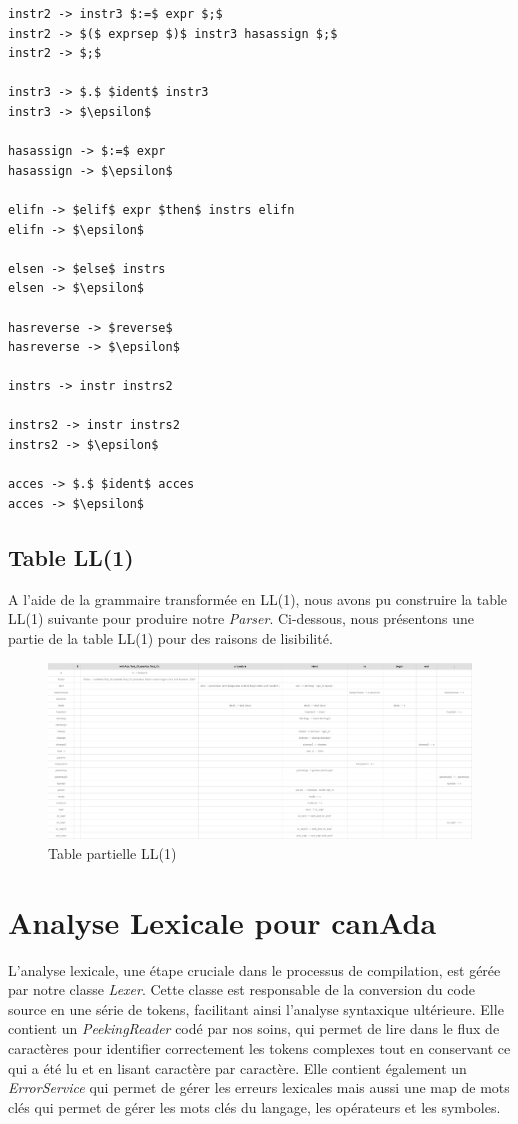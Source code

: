 \documentclass[french,a4paper]{article}
\begin{document}
\begin{lstlisting}[label={lst:lstlisting9}]
instr2 -> instr3 $:=$ expr $;$
instr2 -> $($ exprsep $)$ instr3 hasassign $;$
instr2 -> $;$

instr3 -> $.$ $ident$ instr3
instr3 -> $\epsilon$

hasassign -> $:=$ expr
hasassign -> $\epsilon$

elifn -> $elif$ expr $then$ instrs elifn
elifn -> $\epsilon$

elsen -> $else$ instrs
elsen -> $\epsilon$

hasreverse -> $reverse$
hasreverse -> $\epsilon$

instrs -> instr instrs2

instrs2 -> instr instrs2
instrs2 -> $\epsilon$

acces -> $.$ $ident$ acces
acces -> $\epsilon$
    \end{lstlisting}

    \subsection{Table LL(1)}\label{subsec:table-ll(1)}

    A l'aide de la grammaire transformée en LL(1), nous avons pu construire la table LL(1) suivante pour produire notre \textit{Parser}.
    Ci-dessous, nous présentons une partie de la table LL(1) pour des raisons de lisibilité.

    \begin{figure}[H]
        \centering
        \includegraphics[width=1\textwidth]{partial_table}
        \caption{Table partielle LL(1)}\label{fig:figure2}
    \end{figure}

    \section{Analyse Lexicale pour canAda}\label{sec:analyse-lexicale-pour-canada}

    L'analyse lexicale, une étape cruciale dans le processus de compilation, est gérée par notre classe \textit{Lexer}.
    Cette classe est responsable de la conversion du code source en une série de tokens, facilitant ainsi l'analyse syntaxique ultérieure.
    Elle contient un \textit{PeekingReader} codé par nos soins, qui permet de lire dans le flux de caractères pour identifier correctement les tokens complexes tout en conservant ce qui a été lu et en lisant caractère par caractère.
    Elle contient également un \textit{ErrorService} qui permet de gérer les erreurs lexicales mais aussi une map de mots clés qui permet de gérer les mots clés du langage, les opérateurs et les symboles.
\end{document}
